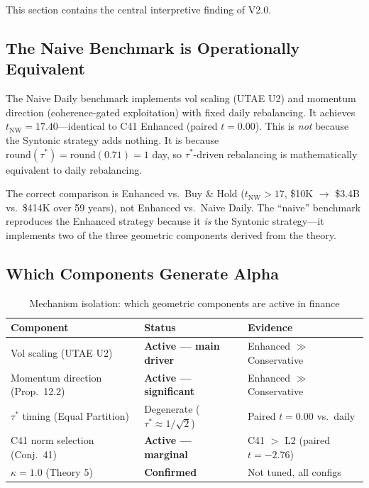 \documentclass[11pt,a4paper]{article}
\begin{document}
This section contains the central interpretive finding of V2.0.

\subsection{The Naive Benchmark is Operationally Equivalent}

The Naive Daily benchmark implements vol scaling (UTAE U2) and momentum direction (coherence-gated exploitation) with fixed daily rebalancing. It achieves $t_{\text{NW}} = 17.40$---identical to C41 Enhanced (paired $t = 0.00$). This is \emph{not} because the Syntonic strategy adds nothing. It is because $\mathrm{round}(\tau^*) = \mathrm{round}(0.71) = 1$ day, so $\tau^*$-driven rebalancing is mathematically equivalent to daily rebalancing.

The correct comparison is Enhanced vs.\ Buy \& Hold ($t_{\text{NW}} > 17$, \$10K $\to$ \$3.4B vs.\ \$414K over 59 years), not Enhanced vs.\ Naive Daily. The ``naive'' benchmark reproduces the Enhanced strategy because it \emph{is} the Syntonic strategy---it implements two of the three geometric components derived from the theory.

\subsection{Which Components Generate Alpha}

\begin{table}[H]
\centering
\caption{Mechanism isolation: which geometric components are active in finance}
\label{tab:isolation}
\begin{tabular}{lll}
\toprule
Component & Status & Evidence \\
\midrule
Vol scaling (UTAE U2) & \textbf{Active --- main driver} & Enhanced $\gg$ Conservative \\
Momentum direction (Prop.~12.2) & \textbf{Active --- significant} & Enhanced $\gg$ Conservative \\
$\tau^*$ timing (Equal Partition) & Degenerate ($\tau^* \approx 1/\sqrt{2}$) & Paired $t = 0.00$ vs.\ daily \\
C41 norm selection (Conj.~41) & \textbf{Active --- marginal} & C41 $>$ L2 (paired $t = -2.76$) \\
$\kappa = 1.0$ (Theory 5) & \textbf{Confirmed} & Not tuned, all configs \\
\bottomrule
\end{tabular}
\end{table}
\end{document}
